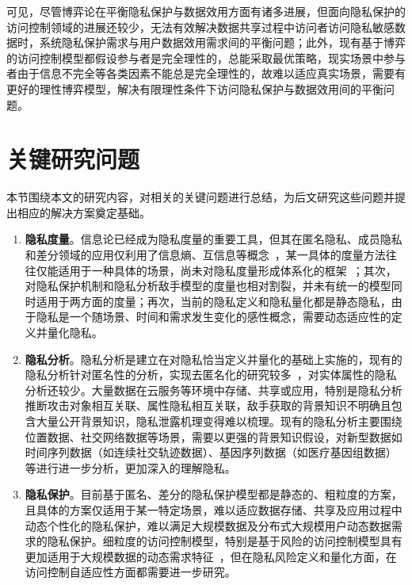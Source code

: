 可见，尽管博弈论在平衡隐私保护与数据效用方面有诸多进展，但面向隐私保护的访问控制领域的进展还较少，无法有效解决数据共享过程中访问者访问隐私敏感数据时，系统隐私保护需求与用户数据效用需求间的平衡问题；此外，现有基于博弈的访问控制模型都假设参与者是完全理性的，总能采取最优策略，现实场景中参与者由于信息不完全等各类因素不能总是完全理性的，故难以适应真实场景，需要有更好的理性博弈模型，解决有限理性条件下访问隐私保护与数据效用间的平衡问题。

\section{关键研究问题}

本节围绕本文的研究内容，对相关的关键问题进行总结，为后文研究这些问题并提出相应的解决方案奠定基础。

\begin{enumerate}
	\item \textbf{隐私度量}。信息论已经成为隐私度量的重要工具，但其在匿名隐私、成员隐私和差分领域的应用仅利用了信息熵、互信息等概念~\cite{wagner2018technical}，某一具体的度量方法往往仅能适用于一种具体的场景，尚未对隐私度量形成体系化的框架~\cite{shokri2011quantifying,manousakas2018quantifying}；其次，对隐私保护机制和隐私分析敌手模型的度量也相对割裂，并未有统一的模型同时适用于两方面的度量；再次，当前的隐私定义和隐私量化都是静态隐私，由于隐私是一个随场景、时间和需求发生变化的感性概念，需要动态适应性的定义并量化隐私。
	
	
	\item \textbf{隐私分析}。隐私分析是建立在对隐私恰当定义并量化的基础上实施的，现有的隐私分析针对匿名性的分析，实现去匿名化的研究较多~\cite{lin2009lbs,manousakas2018quantifying}，对实体属性的隐私分析还较少。大量数据在云服务等环境中存储、共享或应用，特别是隐私分析推断攻击对象相互关联、属性隐私相互关联，敌手获取的背景知识不明确且包含大量公开背景知识，隐私泄露机理变得难以梳理。现有的隐私分析主要围绕位置数据、社交网络数据等场景，需要以更强的背景知识假设，对新型数据如时间序列数据（如连续社交轨迹数据）、基因序列数据（如医疗基因组数据）等进行进一步分析，更加深入的理解隐私。
	
	\item  \textbf{隐私保护}。目前基于匿名、差分的隐私保护模型都是静态的、粗粒度的方案，且具体的方案仅适用于某一特定场景，难以适应数据存储、共享及应用过程中动态个性化的隐私保护，难以满足大规模数据及分布式大规模用户动态数据需求的隐私保护。细粒度的访问控制模型，特别是基于风险的访问控制模型具有更加适用于大规模数据的动态需求特征~\cite{li2017access}，但在隐私风险定义和量化方面，在访问控制自适应性方面都需要进一步研究。
	

\end{enumerate}
